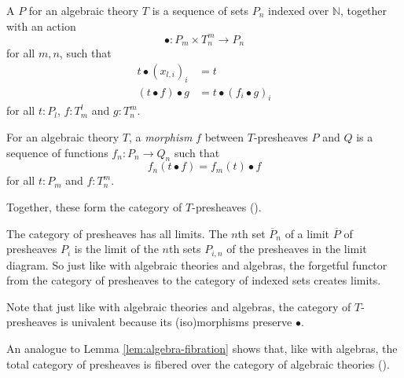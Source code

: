 \begin{definition}
  A  $ P $ for an algebraic theory $ T $ is a sequence of sets $ P_n $ indexed over $ \mathbb N $, together with an action
  \[ \bullet: P_m \times T_n^m \to P_n \]
  for all $ m, n $, such that
  \begin{align*}
    t \bullet (x_{l, i})_i &= t\\
    (t \bullet f) \bullet g &= t \bullet (f_i \bullet g)_i
  \end{align*}
  for all $ t: P_l $, $ f: T_m^l $ and $ g: T_n^m $.
\end{definition}

\begin{definition}
  For an algebraic theory $ T $, a \textit{morphism} $ f $ between $ T $-presheaves $ P $ and $ Q $ is a sequence of functions $ f_n: P_n \to Q_n $ such that
  \[ f_n(t \bullet f) = f_m(t) \bullet f \]
  for all $ t: P_m $ and $ f: T_n^m $.
\end{definition}

Together, these form the category of $ T $-presheaves  ().

\begin{lemma}
  The category of presheaves has all limits. The $ n $th set $ \overline{P}_n $ of a limit $ \overline{P} $ of presheaves $ P_i $ is the limit of the $ n $th sets $ P_{i, n} $ of the presheaves in the limit diagram. So just like with algebraic theories and algebras, the forgetful functor from the category of presheaves to the category of indexed sets creates limits.
\end{lemma}

\begin{lemma}
  Note that just like with algebraic theories and algebras, the category of $ T $-presheaves is univalent because its (iso)morphisms preserve $ \bullet $.
\end{lemma}

An analogue to Lemma \ref{lem:algebra-fibration} shows that, like with algebras, the total category of presheaves is fibered over the category of algebraic theories ().

